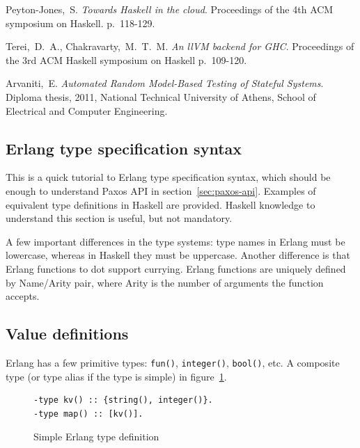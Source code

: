 \documentclass[english,11pt]{l4proj}
\begin{document}
\begin{thebibliography}{99}
     Peyton-Jones,~S. \emph{Towards Haskell in the
    cloud}. Proceedings of the 4th ACM symposium on Haskell. p.~118-129.

     Terei,~D.~A., Chakravarty,~M.~T.~M. \emph{An llVM
    backend for GHC}. Proceedings of the 3rd ACM Haskell symposium on Haskell
    p.~109-120.

     Arvaniti,~E. \emph{Automated Random Model-Based Testing of
    Stateful Systems}. Diploma thesis, 2011, National Technical University of
    Athens, School of Electrical and Computer Engineering.

\end{thebibliography}

\begin{appendices}

\section{Erlang type specification syntax}
\label{sec:spec-syntax}

This is a quick tutorial to Erlang type specification syntax, which should be
enough to understand Paxos API in section~\ref{sec:paxos-api}. Examples of
equivalent type definitions in Haskell are provided. Haskell knowledge to
understand this section is useful, but not mandatory.

A few important differences in the type systems: type names in Erlang must be
lowercase, whereas in Haskell they must be uppercase. Another difference is that
Erlang functions to dot support currying. Erlang functions are uniquely defined
by Name/Arity pair, where Arity is the number of arguments the function accepts.

\subsection{Value definitions}

Erlang has a few primitive types: {\tt fun()}, {\tt integer()}, {\tt bool()},
etc. A composite type (or type alias if the type is simple) in
figure~\ref{fig:erlang-simple-type}.

\begin{figure}
    \begin{verbatim}
-type kv() :: {string(), integer()}.
-type map() :: [kv()].
    \end{verbatim}
    \caption{Simple Erlang type definition}
    \label{fig:erlang-simple-type}
\end{figure}


\end{appendices}
\end{document}
